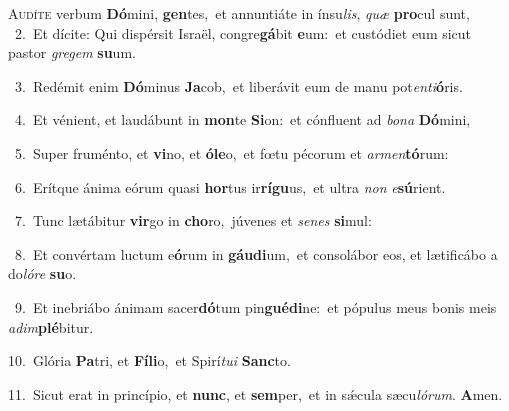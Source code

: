 \lettrine{\initial\textcolor{\initialcolor}{A}}{udíte} verbum \textbf{Dó}\-mini, \textbf{gen}\-tes,~\star et annuntiáte in ínsu\-\textit{lis}\-, \textit{quæ} \textbf{pro}\-cul sunt,\\
{\numbfont\textcolor{\numbcolor}{~2.}}~Et dícite: Qui dispérsit Israël, congre\-\textbf{gá}\-bit \textbf{e}\-um:~\star et custódiet eum sicut pastor \textit{gre}\-\textit{gem} \textbf{su}\-um.\par
{\numbfont\textcolor{\numbcolor}{~3.}}~Redémit enim \textbf{Dó}\-minus \textbf{Ja}\-cob,~\star et liberávit eum de manu pot\-\textit{en}\-\textit{ti}\textbf{ó}ris.\par
{\numbfont\textcolor{\numbcolor}{~4.}}~Et vénient, et laudábunt in \textbf{mon}\-te \textbf{Si}\-on:~\star et cónfluent ad \textit{bo}\-\textit{na} \textbf{Dó}\-mini,\par
{\numbfont\textcolor{\numbcolor}{~5.}}~Super fruménto, et \textbf{vi}\-no, et \textbf{ó}\-\textbf{le}o,~\star et fœtu pécorum et \textit{ar}\-\textit{men}\textbf{tó}rum:\par
{\numbfont\textcolor{\numbcolor}{~6.}}~Erítque ánima eórum quasi \textbf{hor}\-tus ir\-\textbf{rí}\-\textbf{gu}us,~\star et ultra \textit{non} \textit{e}\-\textbf{sú}rient.\par
{\numbfont\textcolor{\numbcolor}{~7.}}~Tunc lætábitur \textbf{vir}\-go in \textbf{cho}\-ro,~\star júvenes et \textit{se}\-\textit{nes} \textbf{si}\-mul:\par
{\numbfont\textcolor{\numbcolor}{~8.}}~Et convértam luctum e\-\textbf{ó}\-rum in \textbf{gáu}\-\textbf{di}um,~\star et consolábor eos, et lætificábo a do\-\textit{ló}\-\textit{re} \textbf{su}\-o.\par
{\numbfont\textcolor{\numbcolor}{~9.}}~Et inebriábo ánimam sacer\-\textbf{dó}\-tum pin\-\textbf{gué}\-\textbf{di}ne:~\star et pópulus meus bonis meis \textit{ad}\-\textit{im}\textbf{plé}bitur.\par
{\numbfont\textcolor{\numbcolor}{10.}}~Glória \textbf{Pa}\-tri, et \textbf{Fí}\-\textbf{li}o,~\star et Spirí\-\textit{tu}\-\textit{i} \textbf{Sanc}\-to.\par
{\numbfont\textcolor{\numbcolor}{11.}}~Sicut erat in princípio, et \textbf{nunc}\-, et \textbf{sem}\-per,~\star et in sǽcula sæcu\-\textit{ló}\-\textit{rum}. \textbf{A}\-men.\par
